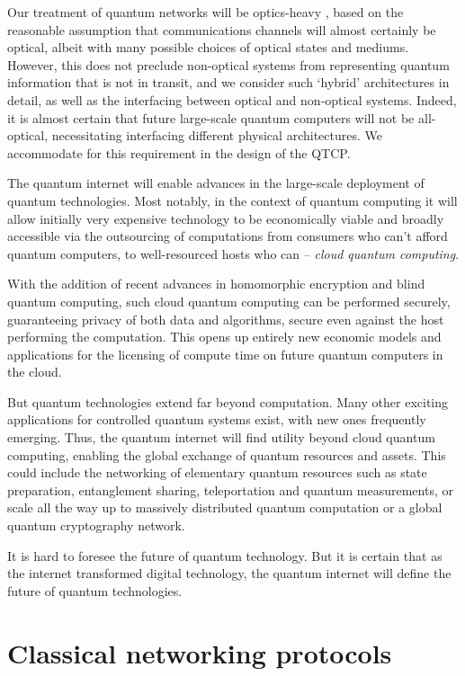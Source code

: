 \documentclass[aps,rmp,twocolumn,amsmath,amssymb,nofootinbib,superscriptaddress,longbibliography,floatfix]{revtex4-1}
\begin{document}
Our treatment of quantum networks will be optics-heavy \cite{bib:GerryKnight05}, based on the reasonable assumption that communications channels will almost certainly be optical, albeit with many possible choices of optical states and mediums. However, this does not preclude non-optical systems from representing quantum information that is not in transit, and we consider such `hybrid' architectures in detail, as well as the interfacing between optical and non-optical systems. Indeed, it is almost certain that future large-scale quantum computers will not be all-optical, necessitating interfacing different physical architectures. We accommodate for this requirement in the design of the QTCP.

The quantum internet will enable advances in the large-scale deployment of quantum technologies. Most notably, in the context of quantum computing it will allow initially very expensive technology to be economically viable and broadly accessible via the outsourcing of computations from consumers who can't afford quantum computers, to well-resourced hosts who can -- \emph{cloud quantum computing}.

With the addition of recent advances in homomorphic encryption and blind quantum computing, such cloud quantum computing can be performed securely, guaranteeing privacy of both data and algorithms, secure even against the host performing the computation. This opens up entirely new economic models and applications for the licensing of compute time on future quantum computers in the cloud.

But quantum technologies extend far beyond computation. Many other exciting applications for controlled quantum systems exist, with new ones frequently emerging. Thus, the quantum internet will find utility beyond cloud quantum computing, enabling the global exchange of quantum resources and assets. This could include the networking of elementary quantum resources such as state preparation, entanglement sharing, teleportation and quantum measurements, or scale all the way up to massively distributed quantum computation or a global quantum cryptography network.

It is hard to foresee the future of quantum technology. But it is certain that as the internet transformed digital technology, the quantum internet will define the future of quantum technologies.

%
%

\section{Classical networking protocols}
\end{document}
